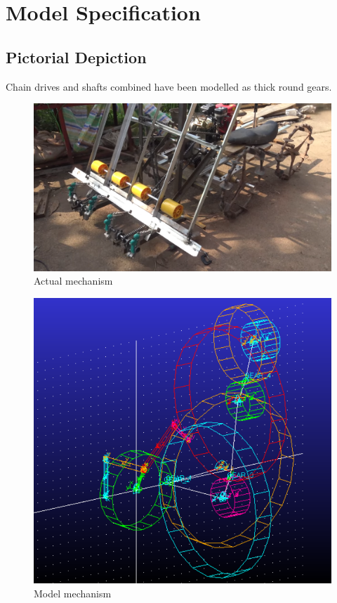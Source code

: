 \section{Model Specification} 
        \subsection{Pictorial Depiction}
            Chain drives and shafts combined have been modelled as thick round gears.
            \begin{figure}[hbt!]
                \centering
                \includegraphics[width=0.9\columnwidth]{Images/Actual_mechanism.png}
                \caption{Actual mechanism}
                \label{fig:actual_mechanism}
            \end{figure}

            \begin{figure}[hbt!]
                \centering
                \includegraphics[width=0.9\columnwidth]{Images/Model_mechanism.png}
                \caption{Model mechanism}
                \label{fig:model_mechanism}
            \end{figure}

